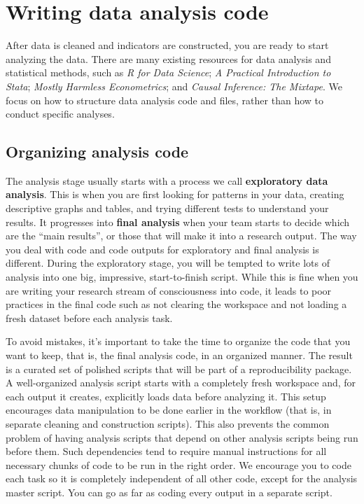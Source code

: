 
\section{Writing data analysis code}

After data is cleaned and indicators are constructed, you are ready to start analyzing the data.
There are many existing resources for data analysis and statistical methods, such as
\textit{R for Data Science};\cite{hadley2017R}
\textit{A Practical Introduction to Stata};\cite{RePEc:gdm:wpaper:9412}
\textit{Mostly Harmless Econometrics};\cite{angrist2008mostly}
and \textit{Causal Inference: The Mixtape}.\cite{cunningham2018causal}
We focus on how to structure data analysis code and files, rather than how to conduct specific analyses.

\subsection{Organizing analysis code}

The analysis stage usually starts with a process we call \textbf{exploratory data analysis}.
This is when you are first looking for patterns in your data,
creating descriptive graphs and tables,
and trying different tests to understand your results.
It progresses into \textbf{final analysis} when your team starts to decide which are the ``main results'', or
those that will make it into a research output.
The way you deal with code and code outputs for exploratory and final analysis is different.
During the exploratory stage,
you will be tempted to write lots of analysis into one big, impressive, start-to-finish script.
While this is fine when you are writing your research stream of consciousness into code,
it leads to poor practices in the final code such as not clearing the workspace
and not loading a fresh dataset before each analysis task.

To avoid mistakes, it's important to take the time
to organize the code that you want to keep, that is,
the final analysis code, in an organized manner.
The result is a curated set of polished scripts that
will be part of a reproducibility package.
A well-organized analysis script starts with a completely fresh workspace
and, for each output it creates, explicitly loads data before analyzing it.
This setup encourages data manipulation to be done earlier in the workflow
(that is, in separate cleaning and construction scripts).
This also prevents the common problem of having analysis scripts
that depend on other analysis scripts being run before them.
Such dependencies tend to require manual instructions
for all necessary chunks of code to be run in the right order.
We encourage you to code each task so
it is completely independent of all other code,
except for the analysis master script.
You can go as far as coding every output in a separate script.

